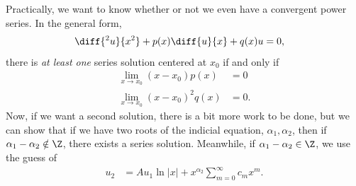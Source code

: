 \documentclass[10pt]{mypackage}
\begin{document}
  Practically, we want to know whether or not we even have a convergent power series. In the general form,
  \begin{align*}
    \diff{^2u}{x^2} + p(x)\diff{u}{x} + q(x)u &= 0,
  \end{align*}
  there is \textit{at least one} series solution centered at $x_0$ if and only if
  \begin{align*}
    \lim_{x\rightarrow x_0}\left( x-x_0 \right)p(x) &= 0\\
    \lim_{x\rightarrow x_0}\left( x-x_0 \right)^2q(x) &= 0.
  \end{align*}
  Now, if we want a second solution, there is a bit more work to be done, but we can show that if we have two roots of the indicial equation, $\alpha_1,\alpha_2$, then if $\alpha_1-\alpha_2\notin \Z$, there exists a series solution. Meanwhile, if $\alpha_1-\alpha_2 \in \Z$, we use the guess of
  \begin{align*}
    u_2 &= Au_1\ln\left\vert x \right\vert + x^{\alpha_2}\sum_{m=0}^{\infty}c_mx^{m}.
  \end{align*}
\end{document}

